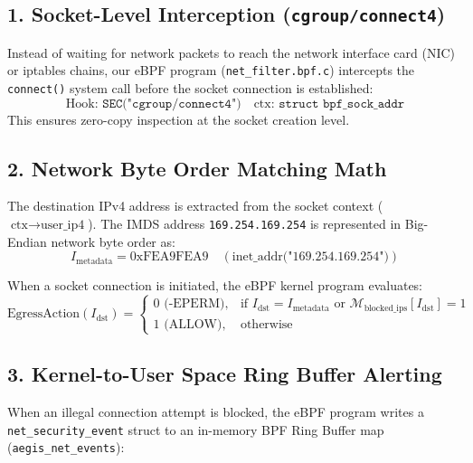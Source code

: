 \documentclass[11pt,a4paper]{article}
\begin{document}
\subsection{1. Socket-Level Interception (\texttt{cgroup/connect4})}
Instead of waiting for network packets to reach the network interface card (NIC) or iptables chains, our eBPF program (\texttt{net\_filter.bpf.c}) intercepts the \texttt{connect()} system call before the socket connection is established:
\begin{equation}
\text{Hook: } \texttt{SEC("cgroup/connect4")} \quad \text{ctx: } \texttt{struct bpf\_sock\_addr}
\end{equation}
This ensures zero-copy inspection at the socket creation level.

\subsection{2. Network Byte Order Matching Math}
The destination IPv4 address is extracted from the socket context ($\text{ctx}\rightarrow\text{user\_ip4}$). The IMDS address \texttt{169.254.169.254} is represented in Big-Endian network byte order as:
\begin{equation}
I_{\text{metadata}} = \text{0xFEA9FEA9} \quad (\text{inet\_addr("169.254.169.254")})
\end{equation}

When a socket connection is initiated, the eBPF kernel program evaluates:
\begin{equation}
\text{EgressAction}(I_{\text{dst}}) = 
\begin{cases} 
0 \text{ (-EPERM)}, & \text{if } I_{\text{dst}} = I_{\text{metadata}} \text{ or } \mathcal{M}_{\text{blocked\_ips}}[I_{\text{dst}}] = 1 \\
1 \text{ (ALLOW)}, & \text{otherwise}
\end{cases}
\end{equation}

\subsection{3. Kernel-to-User Space Ring Buffer Alerting}
When an illegal connection attempt is blocked, the eBPF program writes a \texttt{net\_security\_event} struct to an in-memory BPF Ring Buffer map (\texttt{aegis\_net\_events}):
\end{document}
